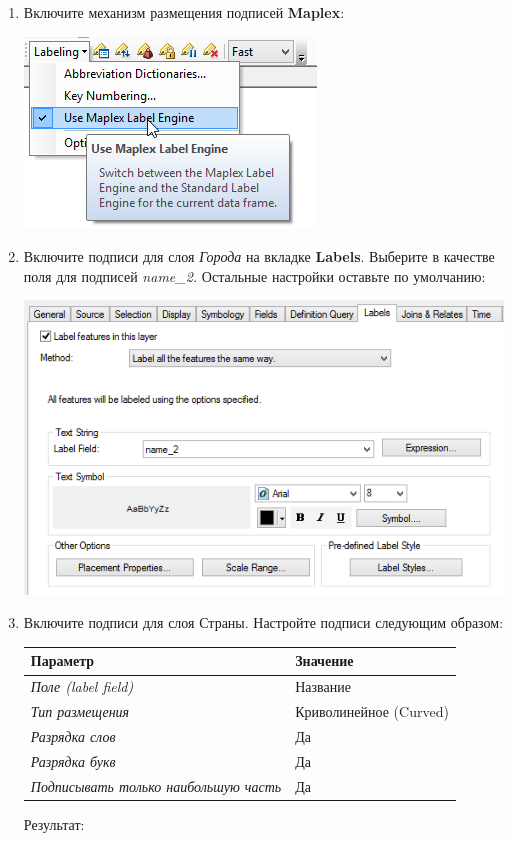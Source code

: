 \documentclass[]{book}
\theoremstyle{definition}
\theoremstyle{definition}
\theoremstyle{definition}
\theoremstyle{remark}
\begin{document}
\begin{enumerate}
\def\labelenumi{\arabic{enumi}.}
\item
  Включите механизм размещения подписей \textbf{Maplex}:

  \includegraphics{images/Ex02/image26.png}
\item
  Включите подписи для слоя \emph{Города} на вкладке \textbf{Labels}.
  Выберите в качестве поля для подписей \emph{name\_2.} Остальные
  настройки оставьте по умолчанию:

  \includegraphics{images/Ex02/image27.png}
\item
  Включите подписи для слоя Страны. Настройте подписи следующим образом:

  \begin{longtable}[]{@{}ll@{}}
  \toprule
  \textbf{Параметр} & \textbf{Значение}\tabularnewline
  \midrule
  \endhead
  \emph{Поле (label field)} & Название\tabularnewline
  \emph{Тип размещения} & Криволинейное (Curved)\tabularnewline
  \emph{Разрядка слов} & Да\tabularnewline
  \emph{Разрядка букв} & Да\tabularnewline
  \emph{Подписывать только наибольшую часть} & Да\tabularnewline
  \bottomrule
  \end{longtable}

  Результат:


\end{enumerate}
\end{document}
